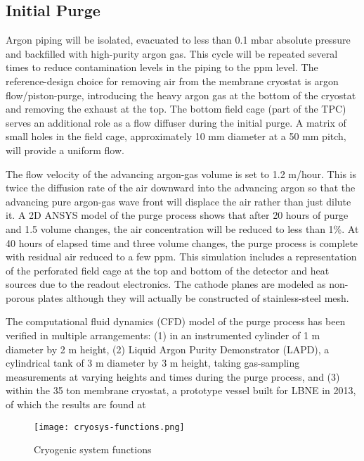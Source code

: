 \subsection{Initial Purge} 

Argon piping will be isolated, evacuated to less than 0.1 mbar 
absolute pressure and backfilled with high-purity argon gas. 
This cycle will be repeated several times to reduce contamination
levels in the piping to the ppm level. The reference-design choice 
for removing air from the membrane cryostat is argon 
flow/piston-purge, introducing the heavy argon gas at the
bottom of the cryostat and removing the exhaust at the top. The bottom 
field cage (part of the TPC) serves an additional role as a flow 
diffuser during the initial purge. A matrix of small holes in the 
field cage, approximately 10 mm diameter at a 50 mm pitch, 
will provide a uniform flow. 

The flow velocity of the advancing argon-gas volume is set to 1.2 m/hour. 
This is twice the diffusion rate of the air downward into the advancing argon 
so that the advancing pure argon-gas wave front will displace the air rather 
than just dilute it. A 2D ANSYS model of the purge process shows that after 
20 hours of purge and 1.5 volume changes, the air concentration will 
be reduced to less than 1\%. At 40 hours of elapsed time and three volume
changes, the purge process is complete with residual air reduced to a few 
ppm. This simulation includes a representation of the perforated field 
cage at the top and bottom of the detector and heat sources due to the 
readout electronics. The cathode planes are modeled as non-porous 
plates although they will actually be constructed of stainless-steel mesh.

The computational fluid dynamics (CFD) model of the purge process 
has been verified in multiple arrangements: (1) in an instrumented 
cylinder of 1 m diameter by 2 m height, (2) Liquid Argon Purity 
Demonstrator (LAPD), a cylindrical tank of 3 m diameter by 3 m height,
taking gas-sampling measurements at varying heights and times during 
the purge process, and (3) within the 35 ton membrane cryostat, a 
prototype vessel built for LBNE in 2013, of which the results 
are found at~\cite{Montanari:2013/06/13aqa} %

\begin{figure}[htbp]
\centering
\texttt{[image: cryosys-functions.png]} 
\caption{Cryogenic system functions}
\label{fig:v5ch2-LBNF-block-diagram-2014}
\end{figure}

